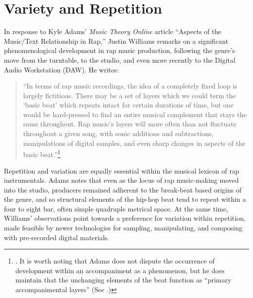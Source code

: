 \onehalfspacing 
\label{chapter2}
\section{Variety and Repetition}
In response to Kyle Adams' \textit{Music Theory Online} article ``Aspects of the Music/Text
Relationship in Rap,'' Justin Williams remarks on a significant phenomenological development
in rap music production, following the genre's move from the turntable, to the studio, and 
even more recently to the Digital Audio Workstation (DAW). He writes:
    \begin{quote}
        \small ``In terms of rap music recordings, the idea of a completely fixed loop is 
        largely fictitious. There may be a set of layers which we could term the `basic beat'
        which repeats intact for certain durations of time, but one would be hard-pressed to
        find an entire musical complement that stays the same throughout. Rap music’s layers
        will more often than not fluctuate throughout a given song, with sonic additions and
        subtractions, manipulations of digital samples, and even sharp changes in aspects of
        the basic beat.''\footnote{
            \cite{justinawilliamsBeatsFlowsResponse2009}. It is worth noting that Adams does 
            not dispute the occurrence of development within an accompaniment as a phenomenon,
            but he does maintain that the unchanging elements of the beat function as ``primary
            accompanimental layers'' (See \cite{kyleadamsPeopleInstinctiveAssumptions2009}.)}
    \end{quote}
Repetition and variation are equally essential within the musical lexicon of rap instrumentals.
Adams notes that even as the locus of rap music-making moved into the studio, producers remained
adherent to the break-beat based origins of the genre, and so structural elements of the hip-hop
beat tend to repeat within a four to eight bar, often simple quadruple metrical space. At the same
time, Williams' observations point towards a preference for variation within repetition, made 
feasible by newer technologies for sampling, manipulating, and composing with pre-recorded digital
materials.

